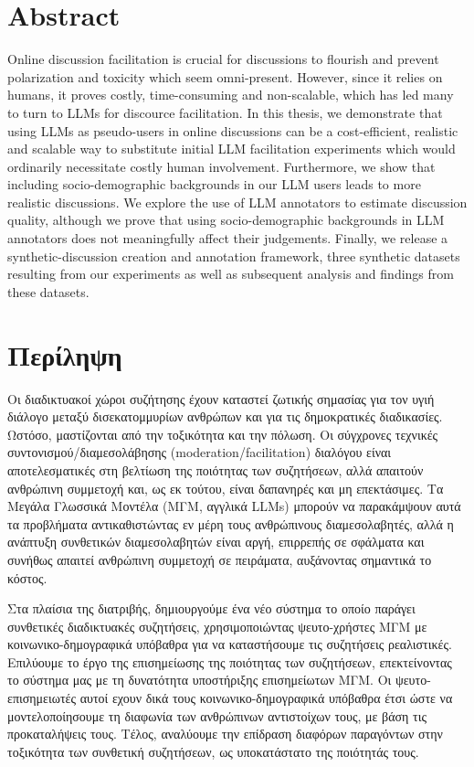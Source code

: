 %

\chapter*{Abstract}
\label{sec:abstract}

Online discussion facilitation is crucial for discussions to flourish and prevent polarization and toxicity which seem omni-present. However, since it relies on humans, it proves costly, time-consuming and non-scalable, which has led many to turn to LLMs for discource facilitation. In this thesis, we demonstrate that using LLMs as pseudo-users in online discussions can be a cost-efficient, realistic and scalable way to substitute initial LLM facilitation experiments which would ordinarily necessitate costly human involvement. Furthermore, we show that including socio-demographic backgrounds in our LLM users leads to more realistic discussions. We explore the use of LLM annotators to estimate discussion quality, although we prove that using socio-demographic backgrounds in LLM annotators does not meaningfully affect their judgements. Finally, we release a synthetic-discussion creation and annotation framework, three synthetic datasets resulting from our experiments as well as subsequent analysis and findings from these datasets.

\chapter*{Περίληψη}
\label{sec:abstract_greek}


Οι διαδικτυακοί χώροι συζήτησης έχουν καταστεί ζωτικής σημασίας για τον υγιή διάλογο μεταξύ δισεκατομμυρίων ανθρώπων και για τις δημοκρατικές διαδικασίες. Ωστόσο, μαστίζονται από την τοξικότητα και την πόλωση. Οι σύγχρονες τεχνικές συντονισμού/διαμεσολάβησης (moderation/facilitation) διαλόγου είναι αποτελεσματικές στη βελτίωση της ποιότητας των συζητήσεων, αλλά απαιτούν ανθρώπινη συμμετοχή και, ως εκ τούτου, είναι δαπανηρές και μη επεκτάσιμες. Τα Μεγάλα Γλωσσικά Μοντέλα (ΜΓΜ, αγγλικά LLMs) μπορούν να παρακάμψουν αυτά τα προβλήματα αντικαθιστώντας εν μέρη τους ανθρώπινους διαμεσολαβητές, αλλά η ανάπτυξη συνθετικών διαμεσολαβητών είναι αργή, επιρρεπής σε σφάλματα και συνήθως απαιτεί ανθρώπινη συμμετοχή σε πειράματα, αυξάνοντας σημαντικά το κόστος. 

Στα πλαίσια της διατριβής, δημιουργούμε ένα νέο σύστημα το οποίο παράγει συνθετικές διαδικτυακές συζητήσεις, χρησιμοποιώντας ψευτο-χρήστες ΜΓΜ με κοινωνικο-δημογραφικά υπόβαθρα για να καταστήσουμε τις συζητήσεις ρεαλιστικές. Επιλύουμε το έργο της επισημείωσης της ποιότητας των συζητήσεων, επεκτείνοντας το σύστημα μας με τη δυνατότητα υποστήριξης επισημείωτων ΜΓΜ. Οι ψευτο-επισημειωτές αυτοί εχουν δικά τους κοινωνικο-δημογραφικά υπόβαθρα έτσι ώστε να μοντελοποίησουμε τη διαφωνία των ανθρώπινων αντιστοίχων τους, με βάση τις προκαταλήψεις τους. Τέλος, αναλύουμε την επίδραση διαφόρων παραγόντων στην τοξικότητα των συνθετική συζητήσεων, ως υποκατάστατο της ποιότητάς τους. 

